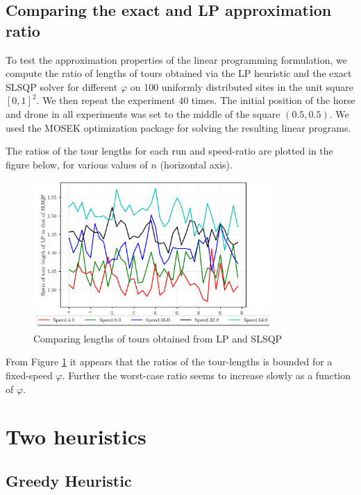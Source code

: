 \documentclass[conference]{IEEEtran}
\begin{document}
\subsection{Comparing the exact and LP approximation ratio}

To test the approximation properties of the linear programming formulation, we compute the ratio of lengths of tours 
obtained via the LP heuristic and the exact SLSQP solver for different $\varphi$ on 100 uniformly distributed sites
in the unit square \([0,1]^2\). We then repeat the experiment 40 times. The initial position of the horse and drone
in all experiments was set to the middle of the square \((0.5,0.5)\). We used the MOSEK\cite{mosek} optimization
package for solving the resulting linear programs. 

The ratios of the tour lengths for each run and speed-ratio are plotted in the figure below, for various values of $n$ (horizontal axis).

\begin{figure}[h!]
\centering
\includegraphics[width=9cm]{img/tour_length_ratios.png}
\caption{ Comparing lengths of tours obtained from LP and SLSQP}
\label{fig:lpslsqp_expt}
\end{figure}

From Figure \ref{fig:lpslsqp_expt} it appears that the ratios of the tour-lengths is bounded for a
fixed-speed $\varphi$. Further the worst-case ratio seems to increase slowly
as a function of $\varphi$.


\section{Two heuristics}
\subsection{Greedy Heuristic}
\label{greedy}
\end{document}
